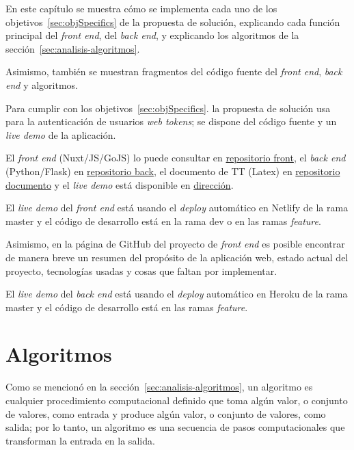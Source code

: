 En este capítulo se muestra cómo se implementa cada uno de los objetivos~\ref{sec:objSpecifics} de la propuesta de solución, explicando cada función principal del \textit{front end}, del \textit{back end}, y explicando los algoritmos de la sección~\ref{sec:analisis-algoritmos}.

Asimismo, también se muestran fragmentos del código fuente del \textit{front end}, \textit{back end} y algoritmos. 


Para cumplir con los objetivos~\ref{sec:objSpecifics}. la propuesta de solución usa para la autenticación de usuarios \textit{web tokens}; se dispone del código fuente y un \textit{live demo} de la aplicación.

\label{ref:prototipo}
El \textit{front end} (Nuxt/JS/GoJS) lo puede consultar en \href{https://github.com/martinez-acosta/TT-2019-B052}{repositorio front}, el \textit{back end} (Python/Flask) en \href{https://github.com/omaraparicio07/api-tt-2019-b052}{repositorio back}, el documento de TT (Latex) en \href{https://github.com/martinez-acosta/DOCS-TT-2019-B052}{repositorio documento} y el \textit{live demo} está disponible en \href{https://serene-haibt-2239b4.netlify.app/}{dirección}.


El \textit{live demo} del \textit{front end} está usando el \textit{deploy} automático en Netlify de la rama master y el código de desarrollo está en la rama dev o en las ramas \textit{feature}.


Asimismo, en la página de GitHub del proyecto de \textit{front end} es posible encontrar de manera breve un resumen del propósito de la aplicación web, estado actual del proyecto, tecnologías usadas y cosas que faltan por implementar.


El \textit{live demo} del \textit{back end} está usando el \textit{deploy} automático en Heroku de la rama master y el código de desarrollo está en las ramas \textit{feature}.















\section{Algoritmos}
Como se mencionó en la sección~\ref{sec:analisis-algoritmos}, un algoritmo es cualquier procedimiento computacional definido que toma algún valor, o conjunto de valores, como entrada y produce algún valor, o conjunto de valores, como salida; por lo tanto, un algoritmo es una secuencia de pasos computacionales que transforman la entrada en la salida.


